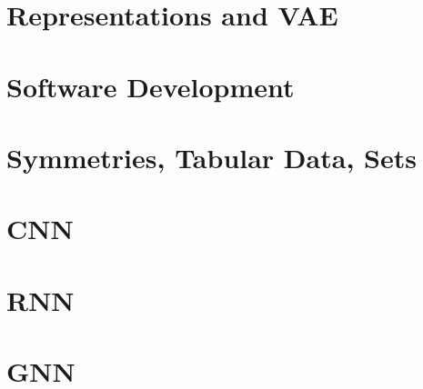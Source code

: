 \documentclass{article}
\begin{document}
\section{Representations and VAE}

\newpage

\section{Software Development}

\newpage

\section{Symmetries, Tabular Data, Sets}

\newpage

\section{CNN}

\newpage

\section{RNN}

\newpage

\section{GNN}

\end{document}
